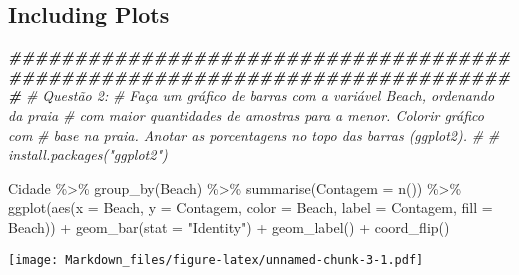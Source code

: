 \documentclass[
]{article}
\newenvironment{Shaded}{\begin{snugshade}}{\end{snugshade}}
\newcommand{\AttributeTok}[1]{\textcolor[rgb]{0.77,0.63,0.00}{#1}}
\newcommand{\CommentTok}[1]{\textcolor[rgb]{0.56,0.35,0.01}{\textit{#1}}}
\newcommand{\DocumentationTok}[1]{\textcolor[rgb]{0.56,0.35,0.01}{\textbf{\textit{#1}}}}
\newcommand{\FunctionTok}[1]{\textcolor[rgb]{0.00,0.00,0.00}{#1}}
\newcommand{\NormalTok}[1]{#1}
\newcommand{\SpecialCharTok}[1]{\textcolor[rgb]{0.00,0.00,0.00}{#1}}
\newcommand{\StringTok}[1]{\textcolor[rgb]{0.31,0.60,0.02}{#1}}
\begin{document}
\hypertarget{including-plots}{%
\subsection{Including Plots}\label{including-plots}}

\begin{Shaded}
\begin{Highlighting}[]
\DocumentationTok{\#\#\#\#\#\#\#\#\#\#\#\#\#\#\#\#\#\#\#\#\#\#\#\#\#\#\#\#\#\#\#\#\#\#\#\#\#\#\#\#\#\#\#\#\#\#\#\#\#\#\#\#\#\#\#\#\#\#\#\#\#\#\#\#\#\#\#\#\#\#\#\#\#\#\#\#\# }
\CommentTok{\# Questão 2:}
\CommentTok{\#   Faça um gráfico de barras com a variável Beach, ordenando da praia }
\CommentTok{\#   com maior quantidades de amostras para a menor. Colorir gráfico com }
\CommentTok{\#   base na praia. Anotar as porcentagens no topo das barras (ggplot2).}
\CommentTok{\#}
\CommentTok{\# install.packages("ggplot2")}

\NormalTok{Cidade }\SpecialCharTok{\%\textgreater{}\%} \FunctionTok{group\_by}\NormalTok{(Beach) }\SpecialCharTok{\%\textgreater{}\%} \FunctionTok{summarise}\NormalTok{(}\AttributeTok{Contagem =} \FunctionTok{n}\NormalTok{()) }\SpecialCharTok{\%\textgreater{}\%} \FunctionTok{ggplot}\NormalTok{(}\FunctionTok{aes}\NormalTok{(}\AttributeTok{x =}\NormalTok{ Beach, }\AttributeTok{y =}\NormalTok{ Contagem, }\AttributeTok{color =}\NormalTok{ Beach, }\AttributeTok{label =}\NormalTok{ Contagem, }\AttributeTok{fill =}\NormalTok{ Beach)) }\SpecialCharTok{+} \FunctionTok{geom\_bar}\NormalTok{(}\AttributeTok{stat =} \StringTok{"Identity"}\NormalTok{) }\SpecialCharTok{+} \FunctionTok{geom\_label}\NormalTok{() }\SpecialCharTok{+} \FunctionTok{coord\_flip}\NormalTok{() }
\end{Highlighting}
\end{Shaded}

\texttt{[image: Markdown\_files/figure-latex/unnamed-chunk-3-1.pdf]}
\end{document}
